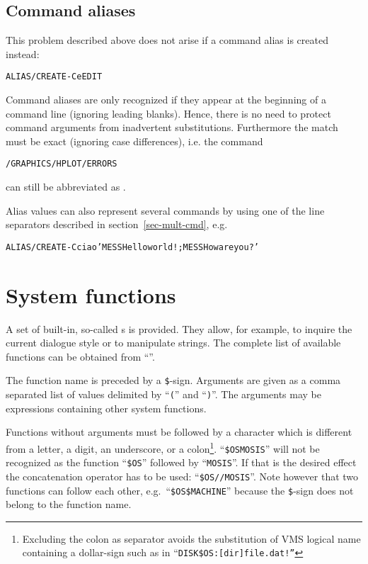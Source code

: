\subsection{Command aliases}

This problem described above does not arise if a command alias is
created instead: 
\begin{alltt}
ALIAS/CREATE -C e EDIT
\end{alltt}
Command aliases are only recognized if they appear at the beginning of a
command line (ignoring leading blanks).
Hence, there is no need to protect command arguments from inadvertent
substitutions.
Furthermore the match must be exact (ignoring case differences), i.e.
the command
\begin{alltt}
/GRAPHICS/HPLOT/ERRORS
\end{alltt}
can still be abbreviated as .

Alias values can also represent several commands by using one of the
line separators described in section~\ref{sec-mult-cmd}, e.g.
\begin{alltt}
ALIAS/CREATE -C ciao 'MESS Hello world! ; MESS How are you?'
\end{alltt}

%
%
\section{System functions}\label{sec-system-functions}

A set of built-in, so-called s 
is provided. They allow, for example, to
inquire the current dialogue style or to manipulate strings.
The complete list of available functions can be obtained from 
``''.

The function name is preceded by a \verb!$!-sign.
Arguments are given as a comma separated
list of values delimited by ``\texttt{(}'' and ``\texttt{)}''.
The arguments may be expressions containing other system functions.

Functions without arguments must be followed by a character which is
different from a letter, a digit, an underscore, or a colon\footnote{
Excluding the colon as separator avoids the substitution of VMS
logical name containing a dollar-sign such as in 
``\texttt{DISK\$OS:[dir]file.dat!''}}.
``\verb!$OSMOSIS!'' will not be recognized as the function
``\verb!$OS!'' followed by ``\texttt{MOSIS}''.
If that is the desired effect the concatenation operator has to be used:
``\verb!$OS//MOSIS!''. 
Note however that two functions can follow each other, e.g.\
``\verb!$OS$MACHINE!'' because the \verb!$!-sign does
not belong to the function name.

